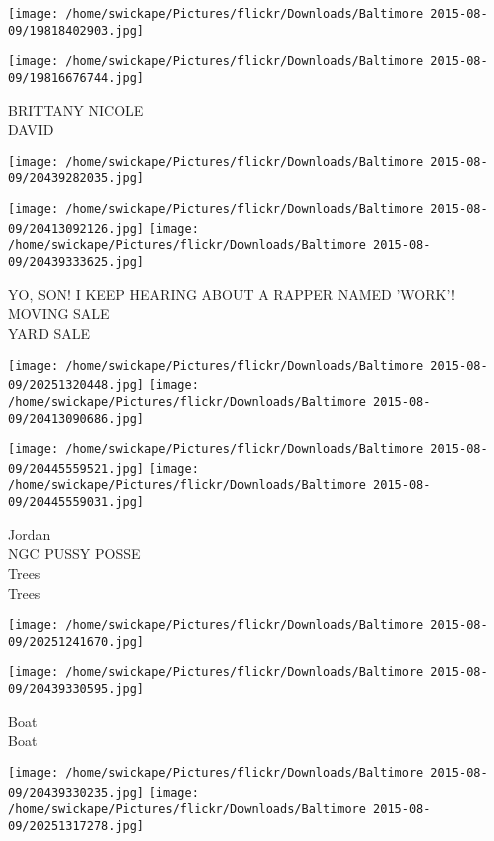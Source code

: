 \documentclass[10pt,letterpaper]{article}
\begin{document}
\texttt{[image: /home/swickape/Pictures/flickr/Downloads/Baltimore 2015-08-09/19818402903.jpg]}

\vspace{0.25in}
\texttt{[image: /home/swickape/Pictures/flickr/Downloads/Baltimore 2015-08-09/19816676744.jpg]}

BRITTANY NICOLE\\
DAVID\\
\pagebreak

\texttt{[image: /home/swickape/Pictures/flickr/Downloads/Baltimore 2015-08-09/20439282035.jpg]}

\vspace{0.25in}
\texttt{[image: /home/swickape/Pictures/flickr/Downloads/Baltimore 2015-08-09/20413092126.jpg]}
\texttt{[image: /home/swickape/Pictures/flickr/Downloads/Baltimore 2015-08-09/20439333625.jpg]}

YO, SON!  I KEEP HEARING ABOUT A RAPPER NAMED 'WORK'!\\
MOVING SALE\\
YARD SALE\\
\pagebreak

\texttt{[image: /home/swickape/Pictures/flickr/Downloads/Baltimore 2015-08-09/20251320448.jpg]}
\texttt{[image: /home/swickape/Pictures/flickr/Downloads/Baltimore 2015-08-09/20413090686.jpg]}

\texttt{[image: /home/swickape/Pictures/flickr/Downloads/Baltimore 2015-08-09/20445559521.jpg]}
\texttt{[image: /home/swickape/Pictures/flickr/Downloads/Baltimore 2015-08-09/20445559031.jpg]}

Jordan\\
NGC PUSSY POSSE\\
Trees\\
Trees\\
\pagebreak

\texttt{[image: /home/swickape/Pictures/flickr/Downloads/Baltimore 2015-08-09/20251241670.jpg]}

\vspace{0.25in}
\texttt{[image: /home/swickape/Pictures/flickr/Downloads/Baltimore 2015-08-09/20439330595.jpg]}

Boat\\
Boat\\
\pagebreak

\texttt{[image: /home/swickape/Pictures/flickr/Downloads/Baltimore 2015-08-09/20439330235.jpg]}
\texttt{[image: /home/swickape/Pictures/flickr/Downloads/Baltimore 2015-08-09/20251317278.jpg]}
\end{document}
